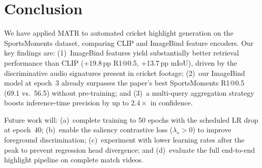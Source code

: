 \documentclass[10pt,twocolumn]{article}
\begin{document}
\section{Conclusion}

We have applied MATR to automated cricket highlight generation on the
SportsMoments dataset, comparing CLIP and ImageBind feature encoders. Our key
findings are: (1)~ImageBind features yield substantially better retrieval
performance than CLIP (+19.8\,pp R1@0.5, +13.7\,pp mIoU), driven by the
discriminative audio signatures present in cricket footage; (2)~our ImageBind
model at epoch~3 already surpasses the paper's best SportsMoments R1@0.5
(69.1 vs.\ 56.5) without pre-training; and (3)~a multi-query aggregation
strategy boosts inference-time precision by up to $2.4\times$ in confidence.

Future work will: (a)~complete training to 50 epochs with the scheduled LR
drop at epoch~40; (b)~enable the saliency contrastive loss ($\lambda_s > 0$)
to improve foreground discrimination; (c)~experiment with lower learning rates
after the peak to prevent regression head divergence; and (d)~evaluate the
full end-to-end highlight pipeline on complete match videos.



\end{document}

